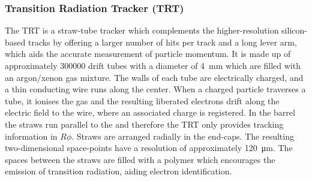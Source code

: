 \subsubsection{Transition Radiation Tracker (TRT)}
The TRT is a straw-tube tracker which complements the higher-resolution silicon-based tracks by offering a larger number of hits per track and a long lever arm, which aids the accurate measurement of particle momentum. 
It is made up of approximately \num{300000} drift tubes with a diameter of \SI{4}{\milli\meter} which are filled with an argon/xenon gas mixture.
The walls of each tube are electrically charged, and a thin conducting wire runs along the center.
When a charged particle traverses a tube, it ionises the gas and the resulting liberated electrons drift along the electric field to the wire, where an associated charge is registered.
In the barrel the straws run parallel to the  and therefore the TRT only provides tracking information in $R\phi$. Straws are arranged radially in the end-caps. The resulting two-dimensional space-points have a resolution of approximately \SI{120}{\micro\meter}.
The spaces between the straws are filled with a polymer which encourages the emission of transition radiation, aiding electron identification.





